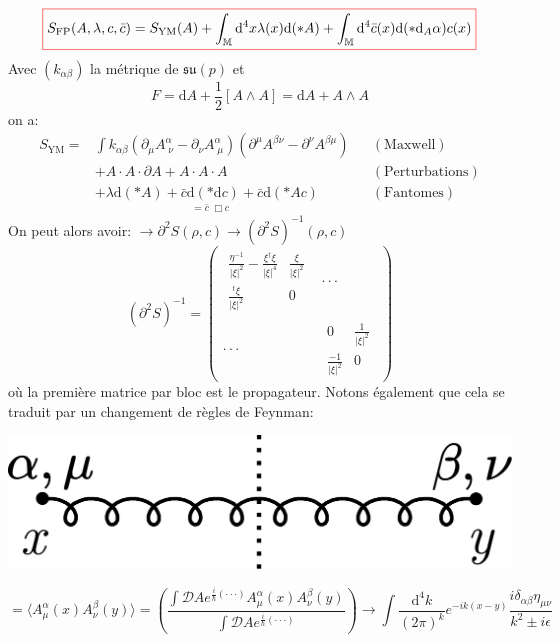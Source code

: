 \documentclass[a4paper,11pt]{article}
\renewcommand{\d}{{\mathrm{d}}}
\newcommand{\D}{{\mathcal{D}}}
\begin{document}
$$\color{red}\boxed{\color{black}
S_\mathrm{FP}(A,\lambda,c,\bar c) = S_\mathrm{YM}(A)+ \int_\mathbb{M}\d^4x \lambda(x) \d(*A) + \int_\mathbb{M}\d^4 \bar c(x) \d(*\d_A\alpha) c(x)
\color{red}}\color{black}$$
Avec $(k_{\alpha\beta})$ la métrique de $\mathfrak{su}(p)$ et
$$F=\d A + \frac12[A\wedge A]= \d A + A\wedge A$$
on a:
\begin{align*}
S_\mathrm{YM} =& \int k_{\alpha\beta} (\partial_\mu A^\alpha_{\;\nu} - \partial_\nu A^\alpha_{\;\mu})(\partial^\mu A^{\beta\nu} - \partial^\nu A^{\beta\mu}) && (\mathrm{Maxwell})\\
&+A\cdot A\cdot\partial A + A\cdot A\cdot A&&(\mathrm{Perturbations})\\
&+\lambda\d(*A) + \underset{= \bar c \;\Box c}{\bar c\d(*\d c)} + \bar c\d(*A c) &&(\mathrm{Fantomes})
\end{align*}
On peut alors avoir: $\to \partial^2S(\rho, c) \to (\partial^2S)^{-1}(\rho,c)$
$$(\partial^2S)^{-1} = \left(\begin{matrix}
	\boxed{\begin{matrix}
	\frac{\eta^{-1}}{|\xi|^2} - \frac{\xi^\dagger \xi}{|\xi|^4}& \frac{\xi}{|\xi|^2}\\
	\frac{^t\xi}{|\xi|^2} & 0
	\end{matrix}} & \cdot\cdot\cdot\\ \cdot\cdot\cdot & \boxed{\begin{matrix}
		0 & \frac{1}{|\xi|^2}\\
		\frac{-1}{|\xi|^2} & 0
	\end{matrix}}
\end{matrix}\right)$$
où la première matrice par bloc est le propagateur.\newpage
\noindent Notons également que cela se traduit par un changement de règles de Feynman:\\

\begin{minipage}{.1\textwidth}
	\!\!\!\!\!\!\!\!\!\!\!\!\!\!\!\!\!\!\includegraphics[width=2\textwidth]{Drawings/Draw_6.pdf}
\end{minipage}
\begin{minipage}{.9\textwidth}
	$$\!\!\!\!= \langle A^\alpha_\mu(x) A_\nu^\beta (y)\rangle  = \left(\frac{\int \D A e^{\frac{i}{\hbar}(\cdot\cdot\cdot)}A^\alpha_\mu(x)A_\nu^\beta(y)}{\int \D A e^{\frac{i}{\hbar}(\cdot\cdot\cdot)}}\right) \longrightarrow  \int \frac{\d^4k}{(2\pi)^k}e^{-ik(x-y)}\frac{i \delta_{\alpha\beta}\eta_{\mu\nu}}{k^2 \pm i\epsilon}$$
\end{minipage}
\end{document}
